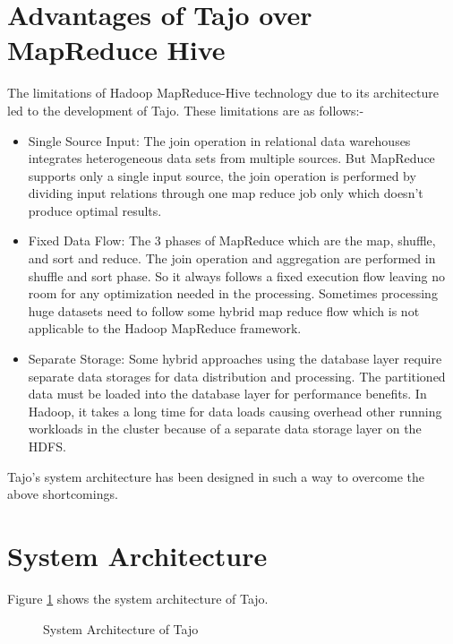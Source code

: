 \documentclass[9pt,twocolumn,twoside]{../../styles/osajnl}
\begin{document}
\section{Advantages of Tajo over MapReduce Hive}
The limitations \cite{tajo-paper} of Hadoop \cite{mapreduce-article}
\cite{hive-paper} MapReduce-Hive technology due to its architecture
led to the development of Tajo. These limitations are as
follows:- \begin{itemize} \item Single Source Input: The join
  operation in relational data warehouses integrates heterogeneous
  data sets from multiple sources. But MapReduce supports only a
  single input source, the join operation is performed by dividing
  input relations through one map reduce job only which doesn't
  produce optimal results. \item Fixed Data Flow: The 3 phases
  \cite{tajo-paper} of MapReduce which are the map, shuffle, and sort
  and reduce. The join operation and aggregation are performed in
  shuffle and sort phase. So it always follows a fixed execution flow
  leaving no room for any optimization needed in the
  processing. Sometimes processing huge datasets need to follow some
  hybrid map reduce flow which is not applicable to the Hadoop
  MapReduce framework. \item Separate Storage: Some hybrid approaches
  \cite{tajo-paper} using the database layer require separate data
  storages for data distribution and processing. The partitioned data
  must be loaded into the database layer for performance benefits. In
  Hadoop, it takes a long time for data loads causing overhead other
  running workloads in the cluster because of a separate data storage
  layer on the HDFS.\end{itemize}

\noindent
Tajo's system architecture has been designed in such a way to overcome
the above shortcomings.


\section{System Architecture}

Figure \ref{fig:architecture} shows the system architecture of Tajo.

\begin{figure}[htbp]
\centering
{}
\caption{\cite{tajo-paper} System Architecture of Tajo}
\label{fig:architecture}
\end{figure}
\end{document}

